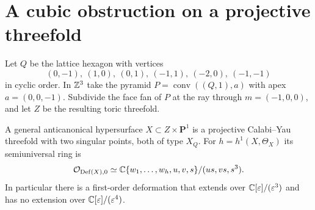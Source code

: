 \section{A cubic obstruction on a projective threefold}\label{sec:compact-example}

Let $Q$ be the lattice hexagon with vertices
\[
 (0,-1),\ (1,0),\ (0,1),\ (-1,1),\ (-2,0),\ (-1,-1)
\]
in cyclic order. In $\mathbb Z^3$ take the pyramid
$P=\operatorname{conv}((Q,1),a)$ with apex $a=(0,0,-1)$.
Subdivide the face fan of $P$ at the ray through $m=(-1,0,0)$, and
let $Z$ be the resulting toric threefold.

\begin{proposition}\label{prop:compact-cubic}
A general anticanonical hypersurface $X\subset Z\times\mathbf P^1$
is a projective Calabi--Yau threefold with two singular points, both
of type $X_Q$. For $h=h^1(X,\Theta_X)$ its semiuniversal ring is
\[
 \mathcal O_{\operatorname{Def}(X),0}\simeq
 \mathbb C\{w_1,\ldots,w_h,u,v,s\}/(us,vs,s^3).
\]
In particular there is a first-order deformation that extends over
$\mathbb C[\varepsilon]/(\varepsilon^3)$ and has no extension over
$\mathbb C[\varepsilon]/(\varepsilon^4)$.
\end{proposition}


